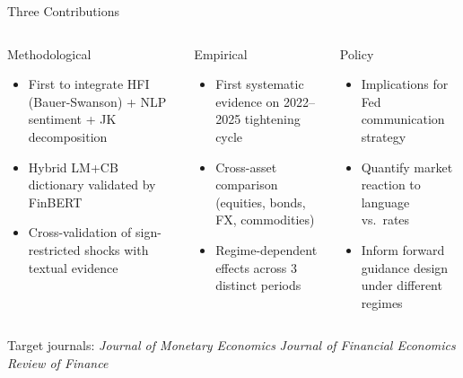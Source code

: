 \documentclass[aspectratio=169, 11pt]{beamer}
\begin{document}
\begin{frame}{Three Contributions}
  \begin{columns}[T]
    \begin{fblock}[4.5cm]{Methodological}
      \footnotesize
      \begin{itemize}
        \item First to \alert{integrate} HFI (Bauer-Swanson) + NLP sentiment + JK decomposition
        \item Hybrid LM+CB dictionary validated by FinBERT
        \item Cross-validation of sign-restricted shocks with textual evidence
      \end{itemize}
    \end{fblock}

    \begin{falertblock}[4.5cm]{Empirical}
      \footnotesize
      \begin{itemize}
        \item First systematic evidence on \alert{2022--2025} tightening cycle
        \item Cross-asset comparison (equities, bonds, FX, commodities)
        \item Regime-dependent effects across 3 distinct periods
      \end{itemize}
    \end{falertblock}

    \begin{fblock}[4.5cm]{Policy}
      \footnotesize
      \begin{itemize}
        \item Implications for \alert{Fed communication strategy}
        \item Quantify market reaction to language vs.\ rates
        \item Inform forward guidance design under different regimes
      \end{itemize}
    \end{fblock}
  \end{columns}

  \vspace{0.4em}
  \begin{center}
    \small Target journals: \textit{Journal of Monetary Economics} \quad \textit{Journal of Financial Economics} \quad \textit{Review of Finance}
  \end{center}
\end{frame}
\end{document}
